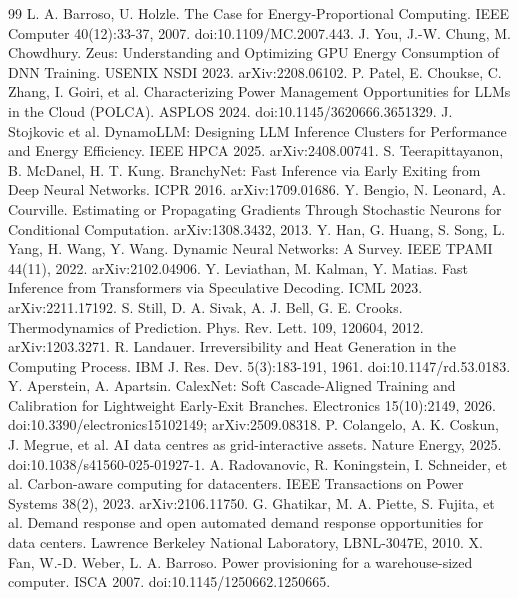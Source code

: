 \begin{thebibliography}{99}
\setlength{\itemsep}{2pt plus 0.5pt}\setlength{\parsep}{0pt}
\label{r1} L. A. Barroso, U. Holzle. The Case for Energy-Proportional Computing. IEEE Computer 40(12):33-37, 2007. doi:10.1109/MC.2007.443.
\label{r2} J. You, J.-W. Chung, M. Chowdhury. Zeus: Understanding and Optimizing GPU Energy Consumption of DNN
Training. USENIX NSDI 2023. arXiv:2208.06102.
\label{r3} P. Patel, E. Choukse, C. Zhang, I. Goiri, et al. Characterizing Power Management Opportunities for LLMs in the Cloud (POLCA). ASPLOS 2024. doi:10.1145/3620666.3651329.
\label{r4} J. Stojkovic et al. DynamoLLM: Designing LLM Inference Clusters for Performance and Energy Efficiency.
IEEE HPCA 2025. arXiv:2408.00741.
\label{r5} S. Teerapittayanon, B. McDanel, H. T. Kung. BranchyNet: Fast Inference via Early Exiting from Deep Neural
Networks. ICPR 2016. arXiv:1709.01686.
\label{r6} Y. Bengio, N. Leonard, A. Courville. Estimating or Propagating Gradients Through Stochastic Neurons for
Conditional Computation. arXiv:1308.3432, 2013.
\label{r7} Y. Han, G. Huang, S. Song, L. Yang, H. Wang, Y. Wang. Dynamic Neural Networks: A Survey. IEEE TPAMI
44(11), 2022. arXiv:2102.04906.
\label{r8} Y. Leviathan, M. Kalman, Y. Matias. Fast Inference from Transformers via Speculative Decoding. ICML 2023.
arXiv:2211.17192.
\label{r9} S. Still, D. A. Sivak, A. J. Bell, G. E. Crooks. Thermodynamics of Prediction. Phys. Rev. Lett. 109,
120604, 2012. arXiv:1203.3271.
\label{r10} R. Landauer. Irreversibility and Heat Generation in the Computing Process. IBM J. Res. Dev. 5(3):183-191, 1961. doi:10.1147/rd.53.0183.
\label{r11} Y. Aperstein, A. Apartsin. CalexNet: Soft Cascade-Aligned Training and Calibration for Lightweight
Early-Exit Branches. Electronics 15(10):2149, 2026. doi:10.3390/electronics15102149; arXiv:2509.08318.
\label{r12} P. Colangelo, A. K. Coskun, J. Megrue, et al. AI data centres as grid-interactive assets. Nature Energy, 2025. doi:10.1038/s41560-025-01927-1.
\label{r13} A. Radovanovic, R. Koningstein, I. Schneider, et al. Carbon-aware computing for datacenters. IEEE Transactions on Power Systems 38(2), 2023. arXiv:2106.11750.
\label{r14} G. Ghatikar, M. A. Piette, S. Fujita, et al. Demand response and open automated demand response opportunities for data centers. Lawrence Berkeley National Laboratory, LBNL-3047E, 2010.
\label{r15} X. Fan, W.-D. Weber, L. A. Barroso. Power provisioning for a warehouse-sized computer. ISCA 2007. doi:10.1145/1250662.1250665.

\end{thebibliography}
